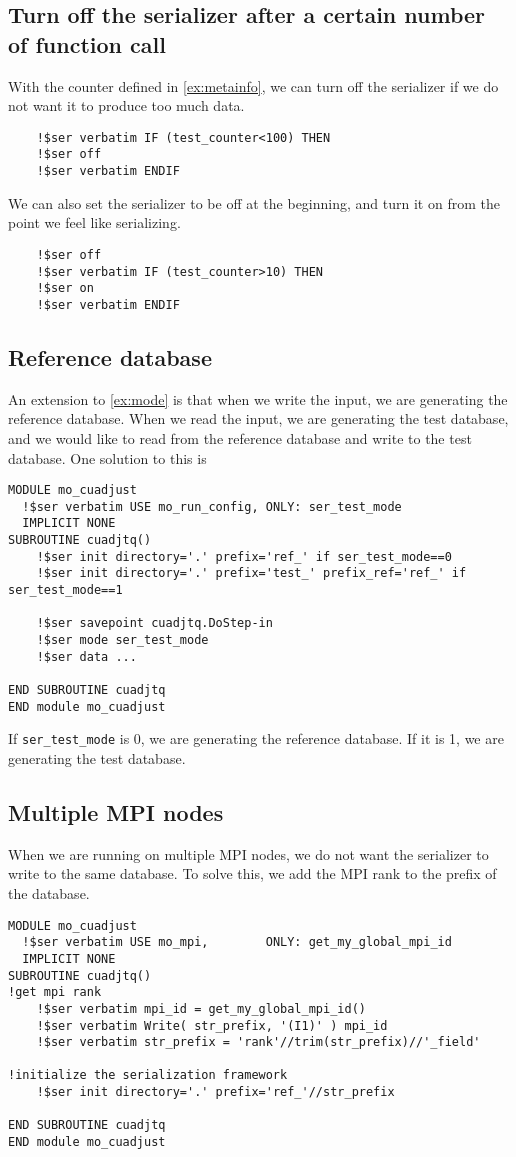 \documentclass{article}
\begin{document}
\subsection{Turn off the serializer after a certain number of function call}
With the counter defined in \ref{ex:metainfo}, we can turn off the serializer if we do not want it to produce too much data.
\begin{lstlisting}
    !$ser verbatim IF (test_counter<100) THEN
    !$ser off
    !$ser verbatim ENDIF
\end{lstlisting}

We can also set the serializer to be off at the beginning, and turn it on from the point we feel like serializing.
\begin{lstlisting}
    !$ser off
    !$ser verbatim IF (test_counter>10) THEN
    !$ser on
    !$ser verbatim ENDIF
\end{lstlisting}

\subsection{Reference database}
An extension to \ref{ex:mode} is that when we write the input, we are generating the reference database. When we read the input, we are generating the test database, and we would like to read from the reference database and write to the test database. One solution to this is
\begin{lstlisting}
MODULE mo_cuadjust
  !$ser verbatim USE mo_run_config, ONLY: ser_test_mode
  IMPLICIT NONE
SUBROUTINE cuadjtq()
    !$ser init directory='.' prefix='ref_' if ser_test_mode==0
    !$ser init directory='.' prefix='test_' prefix_ref='ref_' if ser_test_mode==1

    !$ser savepoint cuadjtq.DoStep-in
    !$ser mode ser_test_mode
    !$ser data ...

END SUBROUTINE cuadjtq
END module mo_cuadjust
\end{lstlisting}

If \texttt{ser\_test\_mode} is 0, we are generating the reference database. If it is 1, we are generating the test database.

\subsection{Multiple MPI nodes}
When we are running on multiple MPI nodes, we do not want the serializer to write to the same database. To solve this, we add the MPI rank to the prefix of the database.
\begin{lstlisting}
MODULE mo_cuadjust
  !$ser verbatim USE mo_mpi,        ONLY: get_my_global_mpi_id
  IMPLICIT NONE
SUBROUTINE cuadjtq()
!get mpi rank
    !$ser verbatim mpi_id = get_my_global_mpi_id()
    !$ser verbatim Write( str_prefix, '(I1)' ) mpi_id
    !$ser verbatim str_prefix = 'rank'//trim(str_prefix)//'_field'

!initialize the serialization framework
    !$ser init directory='.' prefix='ref_'//str_prefix

END SUBROUTINE cuadjtq
END module mo_cuadjust
\end{lstlisting}
\end{document}
